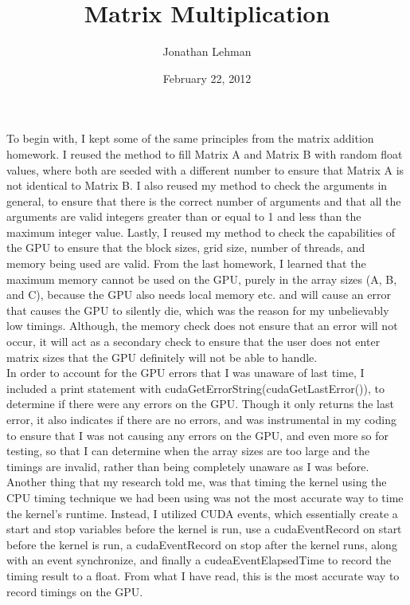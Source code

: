 \documentclass[8pt]{article}
\begin{document}
\title{Matrix Multiplication}
\author{Jonathan Lehman}
\date{February 22, 2012}
\maketitle

To begin with, I kept some of the same principles from the matrix addition homework.  I reused the method to fill Matrix A and Matrix B with random float values, where both are seeded with a different number to ensure that Matrix A is not identical to Matrix B.  I also reused my method to check the arguments in general, to ensure that there is the correct number of arguments and that all the arguments are valid integers greater than or equal to 1 and less than the maximum integer value.  Lastly, I reused my method to check the capabilities of the GPU to ensure that the block sizes, grid size, number of threads, and memory being used are valid.  From the last homework, I learned that the maximum memory cannot be used on the GPU, purely in the array sizes (A, B, and C), because the GPU also needs local memory etc. and will cause an error that causes the GPU to silently die, which was the reason for my unbelievably low timings.  Although, the memory check does not ensure that an error will not occur, it will act as a secondary check to ensure that the user does not enter matrix sizes that the GPU definitely will not be able to handle.\\

In order to account for the GPU errors that I was unaware of last time, I included a print statement with cudaGetErrorString(cudaGetLastError()), to determine if there were any errors on the GPU.  Though it only returns the last error, it also indicates if there are no errors, and was instrumental in my coding to ensure that I was not causing any errors on the GPU, and even more so for testing, so that I can determine when the array sizes are too large and the timings are invalid, rather than being completely unaware as I was before.\\

Another thing that my research told me, was that timing the kernel using the CPU timing technique we had been using was not the most accurate way to time the kernel's runtime.  Instead, I utilized CUDA events, which essentially create a start and stop variables before the kernel is run, use a cudaEventRecord on start before the kernel is run, a cudaEventRecord on stop after the kernel runs, along with an event synchronize, and finally a cudeaEventElapsedTime to record the timing result to a float.  From what I have read, this is the most accurate way to record timings on the GPU.\\
\end{document}

